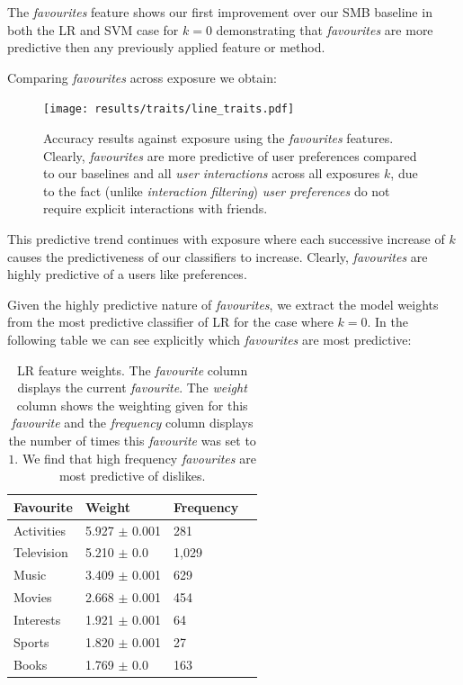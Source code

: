\clearpage

The \emph{favourites} feature shows our first improvement over our SMB baseline in both the LR and SVM case for $k=0$ demonstrating that 
\emph{favourites} are more predictive then any previously applied feature or method.

Comparing \emph{favourites} across exposure we obtain:

\begin{figure}[h]
	\begin{center}
		\texttt{[image: results/traits/line\_traits.pdf]}
		\caption{Accuracy results against exposure using the \emph{favourites} features. Clearly, \emph{favourites} are more predictive of
				 user preferences compared to our baselines and all \emph{user interactions} across all exposures $k$, due to the fact 
				 (unlike \emph{interaction filtering}) \emph{user preferences} do not require explicit interactions with friends.}
	\end{center}
\end{figure}

This predictive trend continues with exposure where each successive increase of $k$ causes the predictiveness of our classifiers to increase. 
Clearly, \emph{favourites} are highly predictive of a users like preferences.

\clearpage

Given the highly predictive nature of \emph{favourites}, we extract the model weights from the most predictive classifier of LR for the case where $k=0$.
In the following table we can see explicitly which \emph{favourites} are most predictive:

\begin{table}[h]
\begin{minipage}[b]{1.0\textwidth}
\centering
  \begin{tabular}{|l|l|l|l|} %
  \hline
  		\textbf{Favourite} & \textbf{Weight} & \textbf{Frequency} \\ \hline
		Activities & 5.927 $\pm$ 0.001 & 281 \\ \hline
		Television & 5.210 $\pm$ 0.0 & 1,029 \\ \hline
		Music & 3.409 $\pm$ 0.001 & 629 \\ \hline
		Movies & 2.668 $\pm$ 0.001 & 454 \\ \hline
		Interests & 1.921 $\pm$ 0.001 & 64 \\ \hline
		Sports & 1.820 $\pm$ 0.001 & 27 \\ \hline		
		Books & 1.769 $\pm$ 0.0 & 163 \\ \hline		
  \end{tabular}
  \caption{LR feature weights. The \emph{favourite} column displays the current \emph{favourite}.
  The \emph{weight} column shows the weighting given for this \emph{favourite} and the \emph{frequency} column displays the number of times 
  this \emph{favourite} was set to $1$. We find that high frequency \emph{favourites} are most predictive of dislikes.}
\end{minipage}
\end{table}

